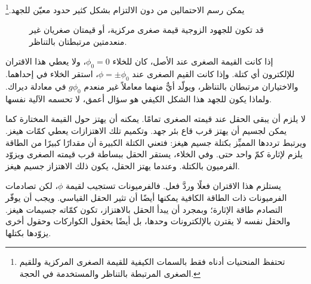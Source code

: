 يمكن رسم الاحتمالين من دون الالتزام بشكل كثير حدود معيّن للجهد.\footnote{تحتفظ المنحنيات أدناه فقط بالسمات الكيفية للقيمة الصغرى المركزية وللقيم الصغرى المرتبطة بالتناظر والمستخدمة في الحجة.}
\begin{figure}[htbp]
\centering
{}
\caption{قد تكون للجهود الزوجية قيمة صغرى مركزية، أو قيمتان صغريان غير منعدمتين مرتبطتان بالتناظر.}
\end{figure}

إذا كانت القيمة الصغرى عند الأصل، كان للخلاء \(\phi_0=0\)، ولا يعطي هذا الاقتران للإلكترون أي كتلة. وإذا كانت القيم الصغرى عند \(\phi=\pm\phi_0\)، استقر الخلاء في إحداهما. والاختياران مرتبطان بالتناظر، ويولّد أيٌّ منهما معاملاً غير منعدم \(g\phi_0\) في معادلة ديراك. ولماذا يكون للجهد هذا الشكل الكيفي هو سؤال أعمق، لا تحسمه الآلية نفسها.

لا يلزم أن يبقى الحقل عند قيمته الصغرى تمامًا. يمكنه أن يهتز حول القيمة المختارة كما يمكن لجسيم أن يهتز قرب قاع بئر جهد. وتكميم تلك الاهتزازات يعطي كمّات هيغز. ويرتبط ترددها المميِّز بكتلة جسيم هيغز: فتعني الكتلة الكبيرة أن مقدارًا كبيرًا من الطاقة يلزم لإثارة كمّ واحد حتى. وفي الخلاء، يستقر الحقل ببساطة قرب قيمته الصغرى ويزوّد الفرميون بالكتلة. وعندما يهتز الحقل، يكون ذلك الاهتزاز جسيم هيغز.

يستلزم هذا الاقتران فعلًا وردَّ فعل. فالفرميونات تستجيب لقيمة \(\phi\)، لكن تصادمات الفرميونات ذات الطاقة الكافية يمكنها أيضًا أن تثير الحقل القياسي. ويجب أن يوفّر التصادم طاقة الإثارة؛ وبمجرد أن يبدأ الحقل بالاهتزاز، تكون كمّاته جسيمات هيغز. والحقل نفسه لا يقترن بالإلكترونات وحدها، بل أيضًا بحقول الكواركات وحقول أخرى يزوّدها بكتلها.

